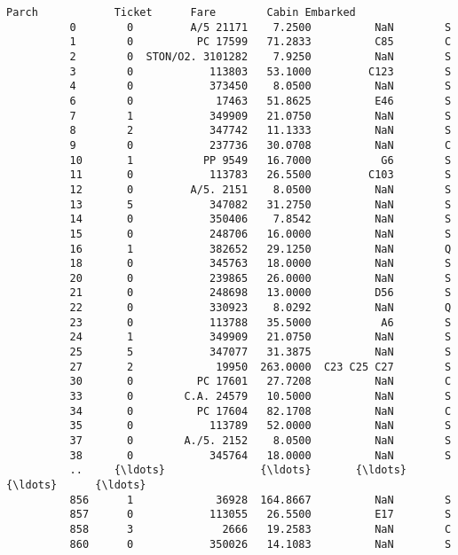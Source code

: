 \documentclass[11pt]{article}
\begin{document}
\begin{Verbatim}[commandchars=\\\{\}]
               Parch            Ticket      Fare        Cabin Embarked  
          0        0         A/5 21171    7.2500          NaN        S  
          1        0          PC 17599   71.2833          C85        C  
          2        0  STON/O2. 3101282    7.9250          NaN        S  
          3        0            113803   53.1000         C123        S  
          4        0            373450    8.0500          NaN        S  
          6        0             17463   51.8625          E46        S  
          7        1            349909   21.0750          NaN        S  
          8        2            347742   11.1333          NaN        S  
          9        0            237736   30.0708          NaN        C  
          10       1           PP 9549   16.7000           G6        S  
          11       0            113783   26.5500         C103        S  
          12       0         A/5. 2151    8.0500          NaN        S  
          13       5            347082   31.2750          NaN        S  
          14       0            350406    7.8542          NaN        S  
          15       0            248706   16.0000          NaN        S  
          16       1            382652   29.1250          NaN        Q  
          18       0            345763   18.0000          NaN        S  
          20       0            239865   26.0000          NaN        S  
          21       0            248698   13.0000          D56        S  
          22       0            330923    8.0292          NaN        Q  
          23       0            113788   35.5000           A6        S  
          24       1            349909   21.0750          NaN        S  
          25       5            347077   31.3875          NaN        S  
          27       2             19950  263.0000  C23 C25 C27        S  
          30       0          PC 17601   27.7208          NaN        C  
          33       0        C.A. 24579   10.5000          NaN        S  
          34       0          PC 17604   82.1708          NaN        C  
          35       0            113789   52.0000          NaN        S  
          37       0        A./5. 2152    8.0500          NaN        S  
          38       0            345764   18.0000          NaN        S  
          ..     {\ldots}               {\ldots}       {\ldots}          {\ldots}      {\ldots}  
          856      1             36928  164.8667          NaN        S  
          857      0            113055   26.5500          E17        S  
          858      3              2666   19.2583          NaN        C  
          860      0            350026   14.1083          NaN        S  

\end{Verbatim}
\end{document}
